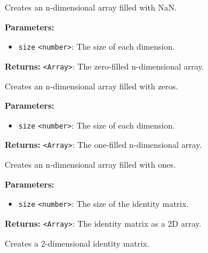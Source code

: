 \documentclass[12pt,a4paper]{article}
\begin{document}
\noindent Creates an n-dimensional array filled with NaN.

\vspace{5mm}
\noindent {}


\noindent \textbf{Parameters:}
\begin{itemize}
  \item \texttt{size} \texttt{<number>}: The size of each dimension.
\end{itemize}

\noindent \textbf{Returns:} \texttt{<Array>}: The zero-filled n-dimensional array.

\noindent Creates an n-dimensional array filled with zeros.

\vspace{5mm}
\noindent {}


\noindent \textbf{Parameters:}
\begin{itemize}
  \item \texttt{size} \texttt{<number>}: The size of each dimension.
\end{itemize}

\noindent \textbf{Returns:} \texttt{<Array>}: The one-filled n-dimensional array.

\noindent Creates an n-dimensional array filled with ones.

\vspace{5mm}
\noindent {}


\noindent \textbf{Parameters:}
\begin{itemize}
  \item \texttt{size} \texttt{<number>}: The size of the identity matrix.
\end{itemize}

\noindent \textbf{Returns:} \texttt{<Array>}: The identity matrix as a 2D array.

\noindent Creates a 2-dimensional identity matrix.

\vspace{5mm}
\noindent {}
\end{document}
